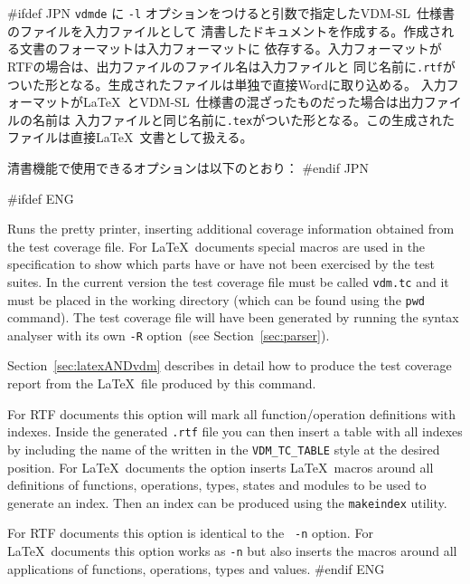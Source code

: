 \documentclass[\pformat,12pt]{article}
\newcommand{\vdmslpp}{VDM-SL}
\newcommand{\vdmde}{vdmde}
\newcommand{\vdmslpp}{VDM++}
\newcommand{\vdmde}{vppde}
\begin{document}
#ifdef JPN
{\tt \vdmde} に {\tt -l} オプションをつけると引数で指定した\vdmslpp\ 仕様書のファイルを入力ファイルとして
清書したドキュメントを作成する。作成される文書のフォーマットは入力フォーマットに
依存する。入力フォーマットがRTFの場合は、出力ファイルのファイル名は入力ファイルと
同じ名前に{\tt .rtf}がついた形となる。生成されたファイルは単独で直接Wordに取り込める。
入力フォーマットが\LaTeX\ と\vdmslpp\ 仕様書の混ざったものだった場合は出力ファイルの名前は
入力ファイルと同じ名前に{\tt .tex}がついた形となる。この生成されたファイルは直接\LaTeX\ 
文書として扱える。

清書機能で使用できるオプションは以下のとおり：
#endif JPN

\begin{description}

#ifdef ENG
\item[{\tt -r}] Runs the pretty printer, inserting additional coverage
  information obtained from the test coverage file. For \LaTeX\ 
  documents special macros are used in the specification to show which
  parts have or have not been exercised by the test suites.  In the
  current version the test coverage file\index{Test Coverage!File}
  must be called {\tt vdm.tc} 
  and it must be placed in the working directory (which can be found
  using the \texttt{pwd} command). The test
  coverage file will have been generated by running the syntax
  analyser with its own {\tt -R} option~(see Section~\ref{sec:parser}).
  
  Section~\ref{sec:latexANDvdm} describes in detail how to produce the
  test coverage report from the \LaTeX\ file produced by this command.

\item[{\tt -n}] For RTF documents this option will mark all
  function/operation definitions with indexes. Inside the generated
  {\tt .rtf} file you can then insert a table with all indexes by
  including the name of the
  \ifthenelse{\boolean{VDMsl}}{module}{class} written in the
  \texttt{VDM\_TC\_TABLE} style at the desired position.
  For \LaTeX\ documents the option inserts \LaTeX\ 
  macros around all definitions of functions, operations, types,
  states and modules to be used to generate an index.  Then an
  index can be produced using the {\tt makeindex} utility.

\item[{\tt -N}] For RTF documents this option is identical to the {\tt
    -n} option. For \LaTeX\ documents this option works as {\tt -n}
  but also inserts the macros around all applications of functions,
  operations, types and values. 
#endif ENG


\end{description}
\end{document}
